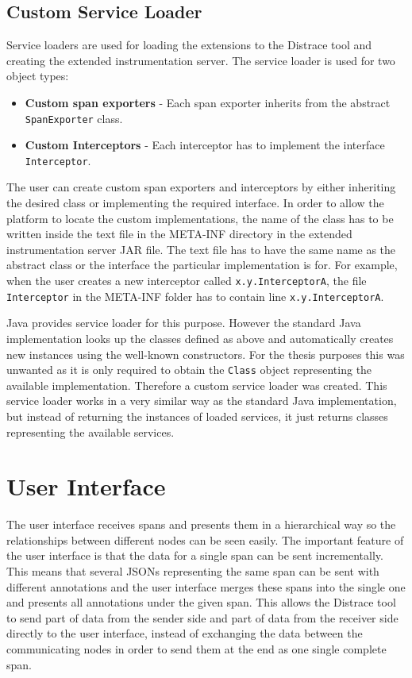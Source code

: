 \subsection{Custom Service Loader}
Service loaders are used for loading the extensions to the Distrace tool and creating the extended instrumentation server. The service loader is used for two object types: 
\begin{itemize}
	\item \textbf{Custom span exporters} - Each span exporter inherits from the abstract \texttt{SpanExporter} class.
	\item \textbf{Custom Interceptors} - Each interceptor has to implement the interface \texttt{Interceptor}.
\end{itemize} 
The user can create custom span exporters and interceptors by either inheriting the desired class or implementing the required interface. In order to allow the platform to locate the custom implementations, the name of the class has to be written inside the text file in the META-INF directory in the extended instrumentation server JAR file. The text file has to have the same name as the abstract class or the interface the particular implementation is for. For example, when the user creates a new interceptor called \texttt{x.y.InterceptorA}, the file \texttt{Interceptor} in the META-INF folder has to contain line \texttt{x.y.InterceptorA}.

Java provides service loader for this purpose. However the standard Java implementation looks up the classes defined as above and automatically creates new instances using the well-known constructors. For the thesis purposes this was unwanted as it is only required to obtain the \texttt{Class} object representing the available implementation. Therefore a custom service loader was created. This service loader works in a very similar way as the standard Java implementation, but instead of returning the instances of loaded services, it just returns classes representing the available services. 

\section{User Interface}
\label{sec:zipkin_ui}
The user interface receives spans and presents them in a hierarchical way so the relationships between different nodes can be seen easily. The important feature of the user interface is that the data for a single span can be sent incrementally. This means that several JSONs representing the same span can be sent with different annotations and the user interface merges these spans into the single one and presents all annotations under the given span. This allows the Distrace tool to send part of data from the sender side and part of data from the receiver side directly to the user interface, instead of exchanging the data between the communicating nodes in order to send them at the end as one single complete span.

